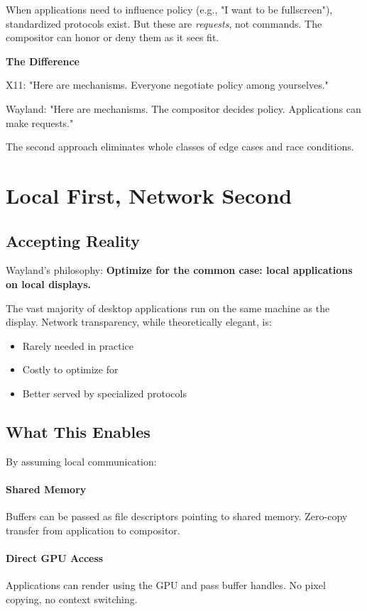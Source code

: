When applications need to influence policy (e.g., "I want to be fullscreen"), standardized protocols exist. But these are \textit{requests}, not commands. The compositor can honor or deny them as it sees fit.

\begin{designbox}
\textbf{The Difference}

X11: "Here are mechanisms. Everyone negotiate policy among yourselves."

Wayland: "Here are mechanisms. The compositor decides policy. Applications can make requests."

The second approach eliminates whole classes of edge cases and race conditions.
\end{designbox}

\section{Local First, Network Second}

\subsection{Accepting Reality}

Wayland's philosophy: \textbf{Optimize for the common case: local applications on local displays.}

The vast majority of desktop applications run on the same machine as the display. Network transparency, while theoretically elegant, is:
\begin{itemize}
    \item Rarely needed in practice
    \item Costly to optimize for
    \item Better served by specialized protocols
\end{itemize}

\subsection{What This Enables}

By assuming local communication:

\paragraph{Shared Memory}
Buffers can be passed as file descriptors pointing to shared memory. Zero-copy transfer from application to compositor.

\paragraph{Direct GPU Access}
Applications can render using the GPU and pass buffer handles. No pixel copying, no context switching.

